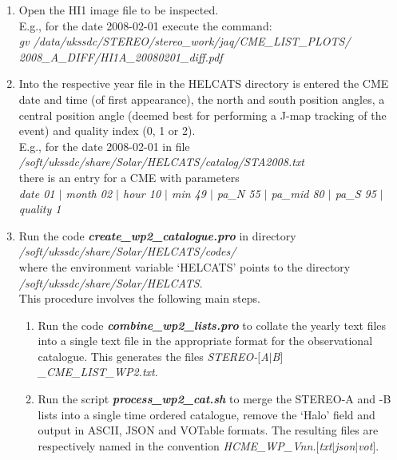 \documentclass[12pt, a4paper, oneside]{article}
\begin{document}
\begin{enumerate}

\item Open the HI1 image file to be inspected. \\
E.g., for the date 2008-02-01 execute the command:\\
\textit{gv /data/ukssdc/STEREO/stereo\_work/jaq/CME\_LIST\_PLOTS/\\2008\_A\_DIFF/HI1A\_20080201\_diff.pdf}

\item Into the respective year file in the HELCATS directory is entered the CME date and time (of first appearance), the north and south position angles, a central position angle (deemed best for performing a J-map tracking of the event) and quality index (0, 1 or 2).\\
E.g., for the date 2008-02-01 in file \\
\textit{/soft/ukssdc/share/Solar/HELCATS/catalog/STA2008.txt}\\
there is an entry for a CME with parameters\\
\textit{date 01 $|$ month 02 $|$ hour 10 $|$ min 49 $|$ pa\_N 55 $|$ pa\_mid 80 $|$ pa\_S 95 $|$ quality 1}

\item Run the code {\bf \textit{create\_wp2\_catalogue.pro}} in directory\\
	\textit{/soft/ukssdc/share/Solar/HELCATS/codes/} \\
	where the environment variable `HELCATS' points to the directory\\
	\textit{/soft/ukssdc/share/Solar/HELCATS}.\\
	This procedure involves the following main steps.

	\begin{enumerate}
	\item Run the code {\bf \textit{combine\_wp2\_lists.pro}} to collate the yearly text files into a single text file in the appropriate format for the observational catalogue. This generates the files \textit{STEREO-$[$A$|$B$]$\_CME\_LIST\_WP2.txt}.

	\item Run the script {\bf \textit{process\_wp2\_cat.sh}} to merge the STEREO-A and -B lists into a single time ordered catalogue, remove the `Halo' field and output in ASCII, JSON and VOTable formats. The resulting files are respectively named in the convention \textit{HCME\_WP\_Vnn.$[$txt$|$json$|$vot$]$}.

	\end{enumerate}
	
\end{enumerate}
\end{document}
